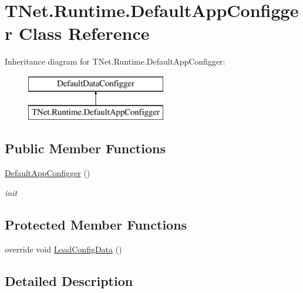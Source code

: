 \hypertarget{class_t_net_1_1_runtime_1_1_default_app_configger}{}\section{T\+Net.\+Runtime.\+Default\+App\+Configger Class Reference}
\label{class_t_net_1_1_runtime_1_1_default_app_configger}


 


Inheritance diagram for T\+Net.\+Runtime.\+Default\+App\+Configger\+:\begin{figure}[H]
\begin{center}
\leavevmode
\includegraphics[height=2.000000cm]{class_t_net_1_1_runtime_1_1_default_app_configger}
\end{center}
\end{figure}
\subsection*{Public Member Functions}
\begin{DoxyCompactItemize}
\item 
\mbox{\hyperlink{class_t_net_1_1_runtime_1_1_default_app_configger_a1f05b5f2fb2181424b82a92aa2de77d7}{Default\+App\+Configger}} ()
\begin{DoxyCompactList}\small\item\em init \end{DoxyCompactList}\end{DoxyCompactItemize}
\subsection*{Protected Member Functions}
\begin{DoxyCompactItemize}
\item 
override void \mbox{\hyperlink{class_t_net_1_1_runtime_1_1_default_app_configger_a09aefe9b9cf22322fa11e37ab46960c0}{Load\+Config\+Data}} ()
\end{DoxyCompactItemize}


\subsection{Detailed Description}




